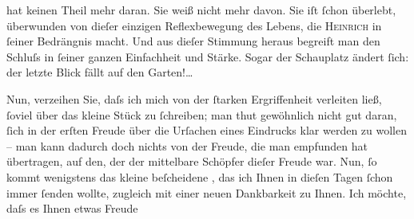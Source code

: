                hat keinen Theil mehr daran. Sie weiß nicht mehr davon. Sie iſt{ }ſchon überlebt,
               überwunden von dieſer einzigen Reflexbewegung des Lebens, die \textsc{Heinrich} in{ }ſeiner Bedrängnis macht. Und aus dieſer Stimmung heraus begreift man den
               Schluſs in{ }ſeiner ganzen Einfachheit und Stärke. Sogar der Schauplatz ändert{ }ſich:
               der letzte Blick fällt auf den Garten!{\dots}\pend
           
\pstart
           Nun, verzeihen Sie, daſs ich mich von der{ }ſtarken Ergriffenheit verleiten ließ,{ }ſoviel über das kleine Stück zu{ }ſchreiben; man thut gewöhnlich nicht gut daran,{ }ſich in der erſten Freude über die
               Urſachen eines Eindrucks klar werden zu wollen – {\pb}man kann dadurch doch nichts von der
               Freude, die man empfunden hat übertragen, auf den, der der mittelbare Schöpfer dieſer
               Freude war. Nun,{ }ſo kommt wenigstens das kleine beſcheidene \label{K_L04540-2v}\label{K_L04540-2}, das ich Ihnen in dieſen Tagen{ }ſchon immer{ }ſenden wollte,
               zugleich mit einer neuen Dankbarkeit zu Ihnen. Ich möchte, daſs es Ihnen etwas Freude
